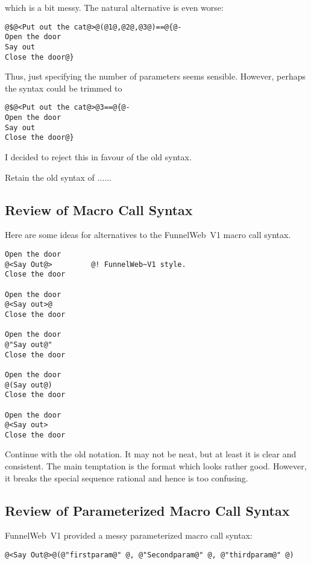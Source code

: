 which is a bit messy. The natural alternative is even worse:

\begin{verbatim}
@$@<Put out the cat@>@(@1@,@2@,@3@)==@{@-
Open the door
Say out
Close the door@}
\end{verbatim}

Thus, just specifying the number of parameters seems sensible. However,
perhaps the syntax could be trimmed to

\begin{verbatim}
@$@<Put out the cat@>@3==@{@-
Open the door
Say out
Close the door@}
\end{verbatim}

I decided to reject this in favour of the old syntax.

 Retain the old syntax of $\ldots$$\ldots$

\subsection{Review of Macro Call Syntax}

Here are some ideas for alternatives to the FunnelWeb~V1 macro call syntax.

\begin{verbatim}
Open the door
@<Say Out@>         @! FunnelWeb~V1 style.
Close the door

Open the door
@<Say out>@
Close the door

Open the door
@"Say out@"
Close the door

Open the door
@(Say out@)
Close the door

Open the door
@<Say out>
Close the door
\end{verbatim}

 Continue with the old notation. It may not be neat, but at
least it is clear and consistent. The main temptation is the format
which looks rather good. However, it breaks the special sequence
rational and hence is too confusing.

\subsection{Review of Parameterized Macro Call Syntax}

FunnelWeb~V1 provided a messy parameterized macro call syntax:

\begin{verbatim}
@<Say Out@>@(@"firstparam@" @, @"Secondparam@" @, @"thirdparam@" @)
\end{verbatim}

